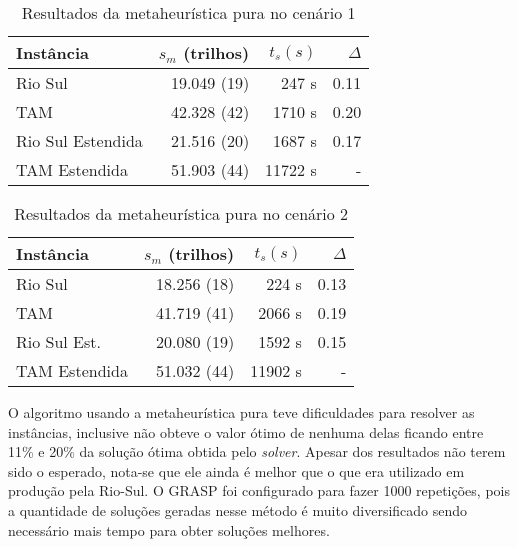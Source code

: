\begin{table}[ht]
\caption{Resultados da metaheurística pura no cenário 1}\label{tab:puracenario1}

\begin{center}
\begin{tabular}{l |r r r}
\hline

Instância 		& $s_{m}$ (trilhos) & $t_{s}(s)$ & $\Delta$
\\
\hline

Rio Sul 			& 19.049 (19) 	& 247 s  & 0.11\\
TAM     			& 42.328 (42)	& 1710 s & 0.20\\
Rio Sul Estendida 	& 21.516 (20)	& 1687 s & 0.17\\
TAM Estendida 		& 51.903 (44)	& 11722 s & -\\

\hline
\end{tabular}
\end{center}
\end{table}


\begin{table}[ht]
\caption{Resultados da metaheurística pura no cenário 2}\label{tab:puracenario2}

\begin{center}
\begin{tabular}{l |r r r}
\hline

Instância 			& $s_{m}$ (trilhos) & $t_{s}(s)$ & $\Delta$
\\
\hline

Rio Sul 			& 18.256 (18) 	& 224 s  & 0.13\\
TAM     			& 41.719 (41)	& 2066 s & 0.19\\
Rio Sul Est. 		& 20.080 (19)	& 1592 s & 0.15\\ 
TAM Estendida 		& 51.032 (44)	& 11902 s & -\\

\hline
\end{tabular}
\end{center}

\end{table}

O algoritmo usando a metaheurística pura teve dificuldades para resolver as
instâncias, inclusive não obteve o valor ótimo de nenhuma delas ficando entre
11\% e 20\% da solução ótima obtida pelo \textit{solver}. Apesar dos
resultados não terem sido o esperado, nota-se que ele ainda é melhor que o que
era utilizado em produção pela Rio-Sul. O GRASP foi configurado para fazer 1000
repetições, pois a quantidade de soluções geradas nesse método é muito
diversificado sendo necessário mais tempo para obter soluções melhores.

